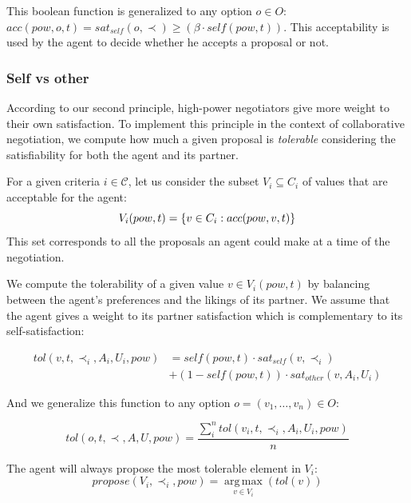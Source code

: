 \documentclass{llncs}
\begin{document}
	This boolean function is generalized to any option $o \in O$: $acc(pow,o, t) = sat_{self}(o, \prec) \geq  (\beta \cdot self(pow,t))$. This acceptability is used by the agent to decide whether he accepts a proposal or not.
	
	
	\subsubsection {Self vs other}
	According to our second principle, high-power negotiators give more weight to their own satisfaction. To implement this principle in the context of collaborative negotiation, we compute how much a given proposal is \emph{tolerable} considering the satisfiability for both the agent and its partner.
	
	For a given criteria $i\in\mathcal{C}$, let us consider the subset $V_i\subseteq C_i$ of values that are acceptable for the agent:
	\vspace{-0.5em} 
	\begin{equation}
	V_i(pow,t) = \{ v\in C_i : acc(pow,v,t) \}
	\vspace{-0.5em}
	\end{equation}
	This set corresponds to all the proposals an agent could make at a time of the negotiation.
	
	We compute the tolerability of a given value $v\in V_i(pow,t)$ by balancing between the agent's preferences and the likings of its partner. We assume that the agent gives a weight to its partner satisfaction which is complementary to its self-satisfaction:
	
	\begin{equation}
	\begin{split}
	tol(v, t, \prec_i, A_i, U_i, pow) & = self(pow, t)  \cdot sat_{self}(v, \prec_i) \\
	& +  (1 - self(pow, t)) \cdot sat_{other}(v, A_i, U_i)
	\end{split} 
	\end{equation}
	
	\noindent
	And we generalize this function to any option $o=(v_1,\ldots,v_n) \in O$:
	
	\begin{equation}
	tol(o, t, \prec, A, U, pow) = \frac{ \sum_{i}^{n} tol(v_i, t, \prec_i, A_i, U_i, pow) } {n}
	\end{equation}
	
	\noindent
	The agent will always propose the most tolerable element in $V_i$:
	\begin{equation}
	propose(V_i, \prec_i,pow) =  \operatorname*{arg\,max}_{v \in V_i} ( tol(v))
	\end{equation}
	
\end{document}
